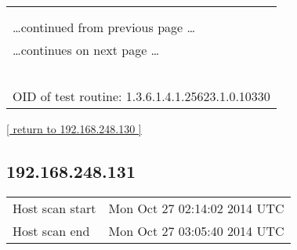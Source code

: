 \documentclass{article}
\begin{document}
\begin{longtable}{|p{}|}
\hline
\rowcolor{openvas_log}{\color{white}{Log (CVSS: 0.0) }}\\
\rowcolor{openvas_log}{\color{white}{NVT: Services}}\\
\hline
\endfirsthead
\hfill\ldots continued from previous page \ldots \\
\hline
\endhead
\hline
\ldots continues on next page \ldots \\
\endfoot
\hline
\endlastfoot
\\
\rowcolor{white}{\verb=A time server seems to be running on this port=}\\
\rowcolor{white}{\verb==}\\
\rowcolor{white}{\verb==}\\
\\
OID of test routine: 1.3.6.1.4.1.25623.1.0.10330\\
\end{longtable}

\begin{footnotesize}\hyperref[host:192.168.248.130]{[ return to 192.168.248.130 ]}\end{footnotesize}
\subsection{192.168.248.131}
\label{host:192.168.248.131}

\begin{tabular}{ll}
Host scan start&Mon Oct 27 02:14:02 2014 UTC\\
Host scan end&Mon Oct 27 03:05:40 2014 UTC\\
\end{tabular}
\end{document}

